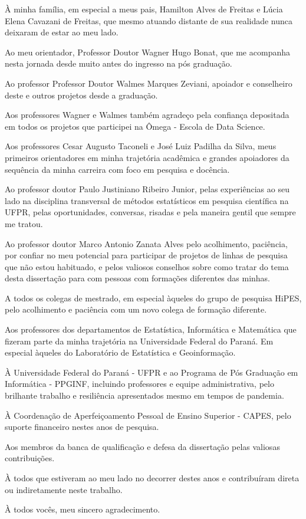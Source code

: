 \begin{agradece}	%

À minha família, em especial a meus pais, Hamilton Alves de Freitas e Lúcia Elena Cavazani de Freitas, que mesmo atuando distante de sua realidade nunca deixaram de estar ao meu lado.

Ao meu orientador, Professor Doutor Wagner Hugo Bonat, que me acompanha nesta jornada desde muito antes do ingresso na pós graduação.

Ao professor Professor Doutor Walmes Marques Zeviani, apoiador e conselheiro deste e outros projetos desde a graduação.

Aos professores Wagner e Walmes também agradeço pela confiança depositada em todos os projetos que participei na Ômega - Escola de Data Science.

Aos professores Cesar Augusto Taconeli e José Luiz Padilha da Silva, meus primeiros orientadores em minha trajetória acadêmica e grandes apoiadores da sequência da minha carreira com foco em pesquisa e docência.

Ao professor doutor Paulo Justiniano Ribeiro Junior, pelas experiências ao seu lado na disciplina transversal de métodos estatísticos em pesquisa científica na UFPR, pelas oportunidades, conversas, risadas e pela maneira gentil que sempre me tratou.

Ao professor doutor Marco Antonio Zanata Alves pelo acolhimento, paciência, por confiar no meu potencial para participar de projetos de linhas de pesquisa que não estou habituado, e pelos valiosos conselhos sobre como tratar do tema desta dissertação para com pessoas com formações diferentes das minhas.

A todos os colegas de mestrado, em especial àqueles do grupo de pesquisa HiPES, pelo acolhimento e paciência com um novo colega de formação diferente.

Aos professores dos departamentos de Estatística, Informática e Matemática que fizeram parte da minha trajetória na Universidade Federal do Paraná. Em especial àqueles do Laboratório de Estatística e Geoinformação. 

À Universidade Federal do Paraná - UFPR e ao Programa de Pós Graduação em Informática - PPGINF, incluindo professores e equipe administrativa, pelo brilhante trabalho e resiliência apresentados mesmo em tempos de pandemia.

À Coordenação de Aperfeiçoamento Pessoal de Ensino Superior - CAPES, pelo suporte financeiro nestes anos de pesquisa.

Aos membros da banca de qualificação e defesa da dissertação pelas valiosas contribuições.

À todos que estiveram ao meu lado no decorrer destes anos e contribuíram direta ou indiretamente neste trabalho. 

À todos vocês, meu sincero agradecimento.

\end{agradece}
